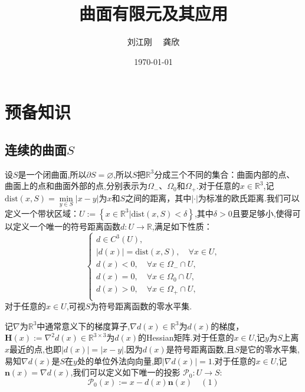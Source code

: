\documentclass{article}
\begin{document}
\title{曲面有限元及其应用}
\author{刘江刚 \ \ 龚欣}
\date{\today}
\maketitle
\newpage
\section{预备知识}
\subsection{连续的曲面$S$}
设$S$是一个闭曲面,所以$\partial S=\varnothing$,所以$S$把$\mathbb{R}^3$分成三个不同的集合：曲面内部的点、曲面上的点和曲面外部的点,分别表示为$\Omega_{-}$、$\Omega_0$和$\Omega_{+}$.对于任意的$x\in\mathbb{R}^3$,记$\mathrm{dist}(x,S)=\min\limits_{y\in S}\left|x-y\right|$为$x$和$S$之间的距离，其中$|\cdot|$为标准的欧氏距离.我们可以定义一个带状区域：$U:=\left\{x\in\mathbb{R}^3|\mathrm{dist}(x,S)<\delta\right\}$,其中$\delta>0$且要足够小,使得可以定义一个唯一的符号距离函数$d:U\rightarrow\mathbb{R}$,满足如下性质：
\begin{equation}\label{eq:MA}
\left\{
\begin{array}{l}
d\in C^3(U),\\
|d(x)|=\mathrm{dist}(x,S),\quad \forall x\in U,\\
d(x)< 0,\quad\forall x\in\Omega_{-}\cap U,\\
d(x)= 0,\quad\forall x\in \Omega_0\cap U,\\
d(x)> 0,\quad\forall x\in\Omega_{+}\cap U,\\
\end{array}\right.
\end{equation}
对于任意的$x\in U$,可视$S$为符号距离函数的零水平集.

记$\nabla$为$\mathbb{R}^3$中通常意义下的梯度算子,$\nabla d(x)\in\mathbb{R}^3$为$d(x)$的梯度，$\boldsymbol{H}(x):=\nabla^2d(x)\in\mathbb{R}^{3\times 3}$为$d(x)$的Hessian矩阵.对于任意的$x\in U$,记$y$为$S$上离$x$最近的点,也即$|d(x)|=\left|x-y\right|$.因为$d(x)$是符号距离函数,且$S$是它的零水平集,易知$\nabla d(x)$是$S$在$y$处的单位外法向向量,即$\left|\nabla d(x)\right|=1$.对于任意的$x\in U$,记$\boldsymbol{n}(x)=\nabla d(x)$,我们可以定义如下唯一的投影
$\mathcal{P}_0:U\rightarrow S$:
\begin{equation*}
\mathcal{P}_0(x):=x-d(x)\boldsymbol{n}(x)\quad(1)
\end{equation*}
\end{document}
